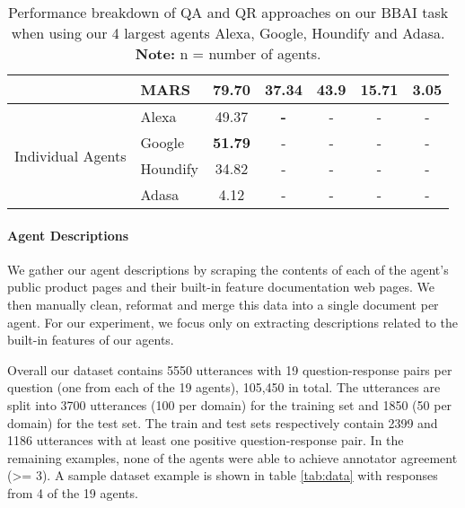 \documentclass[11pt]{article}
\begin{document}
\begin{table*}[]
{\begin{tabular}{|clc|rrrr|}
 & MARS & \textbf{79.70} & 37.34 & \textbf{43.9} & 15.71 & 3.05 \\ \hline
\multirow{4}{*}{Individual Agents} & Alexa & 49.37 & \multicolumn{1}{c}{\textbf{-}} & \multicolumn{1}{c}{-} & \multicolumn{1}{c}{-} & \multicolumn{1}{c|}{-} \\
 & Google & \textbf{51.79} & \multicolumn{1}{c}{-} & \multicolumn{1}{c}{-} & \multicolumn{1}{c}{-} & \multicolumn{1}{c|}{-} \\
 & Houndify & 34.82 & \multicolumn{1}{c}{-} & \multicolumn{1}{c}{-} & \multicolumn{1}{c}{-} & \multicolumn{1}{c|}{-} \\
 & Adasa & 4.12 & \multicolumn{1}{c}{-} & \multicolumn{1}{c}{-} & \multicolumn{1}{c}{-} & \multicolumn{1}{c|}{-} \\ \hline
\end{tabular}
}
\caption{Performance breakdown of QA and QR approaches on our BBAI task when using our 4 largest agents Alexa, Google, Houndify and Adasa. \textbf{Note:} n = number of agents.}
\label{tab:results-4}
\end{table*}

\paragraph{Agent Descriptions}
We gather our agent descriptions by scraping the contents of each of the agent's public product pages and their built-in feature documentation web pages. We then manually clean, reformat and merge this data into a single document per agent. For our experiment, we focus only on extracting descriptions related to the built-in features of our agents.

Overall our dataset contains 5550 utterances with 19 question-response pairs per question (one from each of the 19 agents), 105,450 in total. The utterances are split into 3700 utterances (100 per domain) for the training set and 1850 (50 per domain) for the test set. The train and test sets respectively contain 2399 and 1186 utterances with at least one positive question-response pair. In the remaining examples, none of the agents were able to achieve annotator agreement (>= 3). A sample dataset example is shown in table \ref{tab:data} with responses from 4 of the 19 agents.
\end{document}
